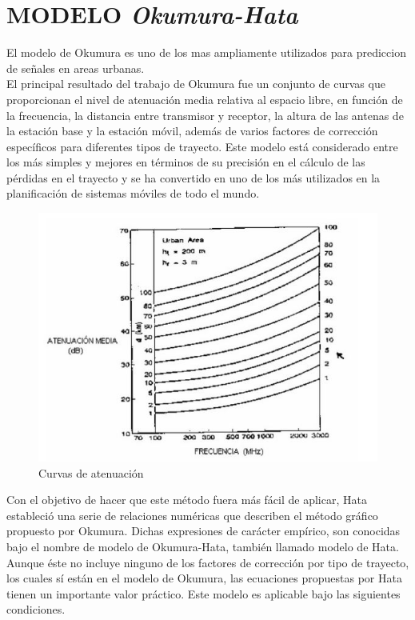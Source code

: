 \documentclass[conference, 9pt, a4paper]{IEEEtran}
\begin{document}
\section{MODELO \textit{Okumura-Hata}}
El modelo de Okumura es uno de los mas ampliamente utilizados para prediccion de señales en areas urbanas.\\
El principal resultado del trabajo de Okumura fue un conjunto de curvas que proporcionan el nivel de atenuación media relativa al espacio libre, en función de la frecuencia, la distancia entre transmisor y receptor, la altura de las antenas de la estación base y
la estación móvil, además de varios factores de corrección específicos para diferentes tipos de trayecto. Este modelo está considerado entre los más simples y mejores en términos de su precisión en el cálculo de las pérdidas en el trayecto y se ha convertido en uno de los más utilizados en la planificación de sistemas móviles de todo el mundo.

\begin{figure}
	\centering
	\includegraphics[width=\columnwidth]{image/okumura.JPG}
	\caption{Curvas de atenuación}
\end{figure}

Con el objetivo de hacer que este método fuera más fácil de aplicar, Hata estableció una serie de relaciones numéricas que describen el método gráfico propuesto por Okumura. Dichas expresiones de carácter empírico, son conocidas bajo el nombre de modelo de Okumura-Hata, también llamado modelo de Hata. Aunque éste no incluye ninguno de los factores de corrección por tipo de trayecto, los cuales sí están en el modelo de Okumura, las ecuaciones propuestas por Hata tienen un importante valor práctico. Este modelo es aplicable bajo las siguientes condiciones.
\end{document}
